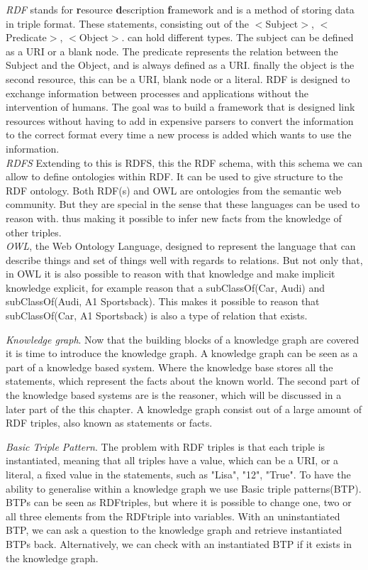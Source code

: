 \documentclass[11pt,letterpaper ,oneside ]{book}
\begin{document}
\textit{RDF} \cite{rdfPrimer:2014} stands for \textbf{r}esource \textbf{d}escription \textbf{f}ramework and is a method of storing data in triple format. These statements, consisting out of the $<$Subject$>$, $<$Predicate$>$, $<$Object$>$. can hold different types. The subject can be defined as a URI or a blank node. The predicate represents the relation between the Subject and the Object, and is always defined as a URI. finally the object is the second resource, this can be a URI, blank node or a literal.
RDF is designed to exchange information between processes and applications without the intervention of humans. The goal was to build a framework that is designed link resources without having to add in expensive parsers to convert the information to the correct format every time a new process is added which wants to use the information.\\

\textit{RDFS} \cite{RDFSchema:2014} Extending to this is RDFS, this the RDF schema, with this schema we can allow to define ontologies within RDF. It can be used to give structure to the RDF ontology. Both RDF(s) and OWL are ontologies from the semantic web community. But they are special in the sense that these languages can be used to reason with. thus making it possible to infer new facts from the knowledge of other triples.\\

\textit{OWL}\cite{OWLPrimer:2012}, the Web Ontology Language, designed to represent the language that can describe things and set of things well with regards to relations. But not only that, in OWL it is also possible to reason with that knowledge and make implicit knowledge explicit, for example reason that a subClassOf(Car, Audi) and subClassOf(Audi, A1 Sportsback). This makes it possible to reason that subClassOf(Car, A1 Sportsback) is also a type of relation that exists. 

\textit{Knowledge graph}. 
Now that the building blocks of a knowledge graph are covered it is time to introduce the knowledge graph. A knowledge graph can be seen as a part of a knowledge based system. Where the knowledge base stores all the statements, which represent the facts about the known world. The second part of the knowledge based systems are is the reasoner, which will be discussed in a later part of the this chapter. A knowledge graph consist out of a large amount of RDF triples, also known as statements or facts.

\textit{Basic Triple Pattern}. The problem with RDF triples is that each triple is instantiated, meaning that all triples have a value, which can be a URI, or a literal,  a fixed value in the statements, such as "Lisa", "12", "True". 
To have the ability to generalise within a knowledge graph we use Basic triple patterns(BTP). BTPs can be seen as RDFtriples, but where it is possible to change one, two or all three elements from the RDFtriple into variables. With an uninstantiated BTP, we can ask a question to the knowledge graph and retrieve instantiated BTPs back. Alternatively, we can check with an instantiated BTP if it exists in the knowledge graph.\\
\end{document}
